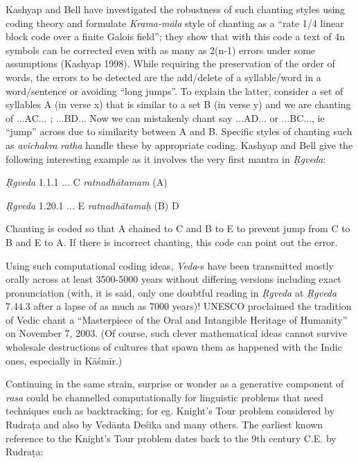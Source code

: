 Kashyap and Bell have investigated the robustness of such chanting styles using coding theory and formulate \textsl{Krama-māla} style of chanting as a “rate 1/4 linear block code over a finite Galois field”; they show that with this code a text of 4n symbols can be corrected even with as many as 2(n-1) errors under some assumptions (Kashyap 1998). While requiring the preservation of the order of words, the errors to be detected are the add/delete of a syllable/word in a word/sentence or avoiding “long jumps”. To explain the latter, consider a set of syllables A (in verse x) that is similar to a set B (in verse y) and we are chanting of  ...AC... ; ...BD... Now we can mistakenly chant say ...AD... or ...BC..., ie “jump” across due to similarity between A and B. Specific styles of chanting such as \textsl{avichakra} \textsl{ratha} handle these by appropriate coding. Kashyap and Bell give the following interesting example as it involves the very first mantra in \textsl{Ṛgveda}:

\smallskip
\begin{myquote}
\textsl{Ṛgveda} 1.1.1     ... C \textsl{ratnadhātamam} (A)

\textsl{Ṛgveda} 1.20.1    ... E \textsl{ratnadhātamaḥ} (B) D
\end{myquote}
\smallskip

Chanting is coded so that A chained to C and B to E to prevent jump from C to B and E to A. If there is incorrect chanting, this code can point out the error. 

Using such computational coding ideas, \textsl{Veda}-s have been transmitted mostly orally across at least 3500-5000 years without differing versions including exact pronunciation (with, it is said, only one doubtful reading in \textsl{Ṛgveda} at \textsl{Ṛgveda} 7.44.3 after a lapse of as much as 7000 years)! UNESCO proclaimed the tradition of Vedic chant a “Masterpiece of the Oral and Intangible Heritage of Humanity” on November 7, 2003. (Of course, such clever mathematical ideas cannot survive wholesale destructions of cultures that spawn them as happened with the Indic ones, especially in Kāśmīr.)

Continuing in the same strain, surprise or wonder as a generative component of \textsl{rasa} could be channelled computationally for linguistic problems that need techniques such as backtracking; for eg. Knight’s Tour problem considered by Rudraṭa and also by Vedānta Deśika and many others. The earliest known reference to the Knight's Tour problem dates back to the 9th century C.E. by Rudraṭa:

